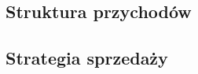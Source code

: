 \documentclass[12pt]{article}
\begin{document}

\subsection{Struktura przychodów}





\subsection{Strategia sprzedaży}


\end{document}
